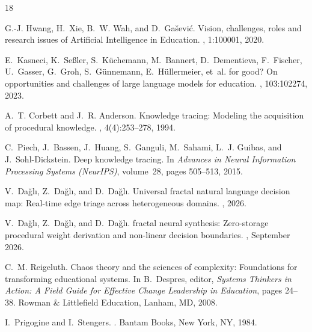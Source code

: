\documentclass[10pt,twocolumn,a4paper]{article}
\begin{document}
\begin{thebibliography}{18}

G.-J. Hwang, H.~Xie, B.~W. Wah, and D.~Ga{\v{s}}evi{\'c}.
\newblock Vision, challenges, roles and research issues of {Artificial
  Intelligence in Education}.
, 1:100001,
  2020.

E.~Kasneci, K.~Se{\ss}ler, S.~K{\"u}chemann, M.~Bannert, D.~Dementieva,
  F.~Fischer, U.~Gasser, G.~Groh, S.~G{\"u}nnemann, E.~H{\"u}llermeier, et~al.
 for good? {On} opportunities and challenges of large
  language models for education.
, 103:102274, 2023.

A.~T. Corbett and J.~R. Anderson.
\newblock Knowledge tracing: Modeling the acquisition of procedural knowledge.
, 4(4):253--278, 1994.

C.~Piech, J.~Bassen, J.~Huang, S.~Ganguli, M.~Sahami, L.~J. Guibas, and
  J.~Sohl-Dickstein.
\newblock Deep knowledge tracing.
\newblock In {\em Advances in Neural Information Processing Systems (NeurIPS)},
  volume~28, pages 505--513, 2015.

V.~Da{\u{g}}l{\i}, Z.~Da{\u{g}}l{\i}, and D.~Da{\u{g}}l{\i}.
\newblock Universal fractal natural language decision map: Real-time edge
  triage across heterogeneous domains.
, 2026.

V.~Da{\u{g}}l{\i}, Z.~Da{\u{g}}l{\i}, and D.~Da{\u{g}}l{\i}.
 fractal neural synthesis: Zero-storage procedural weight
  derivation and non-linear decision boundaries.
, September 2026.

C.~M. Reigeluth.
\newblock Chaos theory and the sciences of complexity: Foundations for
  transforming educational systems.
\newblock In B.~Despres, editor, {\em Systems Thinkers in Action: A Field Guide
  for Effective Change Leadership in Education}, pages 24--38. Rowman \&
  Littlefield Education, Lanham, MD, 2008.

I.~Prigogine and I.~Stengers.
.
\newblock Bantam Books, New York, NY, 1984.


\end{thebibliography}
\end{document}
